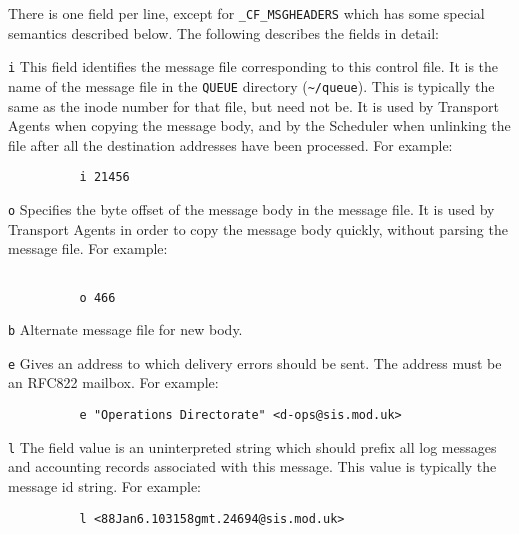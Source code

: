 There is one field per line, except for {\tt \_CF\_MSGHEADERS} which  has
some special semantics described below.  The following describes the fields
in detail:

{\tt i}     
This field identifies the message file corresponding to this control
file.  It is the name of the message file in the {\tt QUEUE}
directory ({\tt \~{}/queue}).  This is typically the same as the
inode number for that file, but need not be.  It is used by Transport
Agents when copying the message body, and by the Scheduler when
unlinking the file after all the destination addresses have been
processed.  For example:

\begin{tscreen}
\begin{verbatim}
          i 21456
\end{verbatim}
\end{tscreen}


{\tt o}     
Specifies the byte offset of the message body in the message file.  It
is used by Transport Agents in order to copy the message body quickly,
without parsing the message file.  For example:

\begin{tscreen}
\begin{verbatim}
     
          o 466
\end{verbatim}
\end{tscreen}


{\tt b}     
Alternate message file for new body.

{\tt e}     
Gives an address to which delivery errors should be sent.  The address
must be an RFC822 mailbox.  For example:

\begin{tscreen}
\begin{verbatim}
          e "Operations Directorate" <d-ops@sis.mod.uk>
\end{verbatim}
\end{tscreen}


{\tt l}     
The field value is an uninterpreted string which should prefix all log
messages and accounting records associated with this message.  This
value is typically the message id string.  For example:

\begin{tscreen}
\begin{verbatim}
          l <88Jan6.103158gmt.24694@sis.mod.uk>
\end{verbatim}
\end{tscreen}


